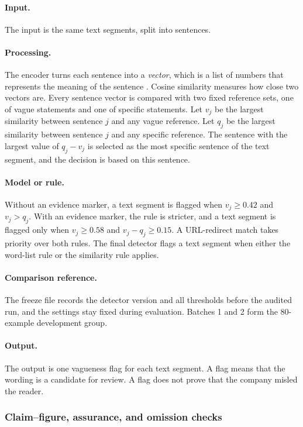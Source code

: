\paragraph{Input.} The input is the same text segments, split into sentences.

\paragraph{Processing.} The  encoder turns each sentence into a \emph{vector}, which is a list of numbers that represents the meaning of the sentence \cite{reimers2019,song2020}. Cosine similarity measures how close two vectors are. Every sentence vector is compared with two fixed reference sets, one of vague statements and one of specific statements. Let $v_j$ be the largest similarity between sentence $j$ and any vague reference. Let $q_j$ be the largest similarity between sentence $j$ and any specific reference. The sentence with the largest value of $q_j-v_j$ is selected as the most specific sentence of the text segment, and the decision is based on this sentence.

\paragraph{Model or rule.} Without an evidence marker, a text segment is flagged when $v_j\geq0.42$ and $v_j>q_j$. With an evidence marker, the rule is stricter, and a text segment is flagged only when $v_j\geq0.58$ and $v_j-q_j\geq0.15$. A URL-redirect match takes priority over both rules. The final detector flags a text segment when either the word-list rule or the similarity rule applies.

\paragraph{Comparison reference.} The freeze file records the detector version and all thresholds before the audited run, and the settings stay fixed during evaluation. Batches 1 and 2 form the 80-example development group.

\paragraph{Output.} The output is one vagueness flag for each text segment. A flag means that the wording is a candidate for review. A flag does not prove that the company misled the reader.

\subsubsection{Claim--figure, assurance, and omission checks}

